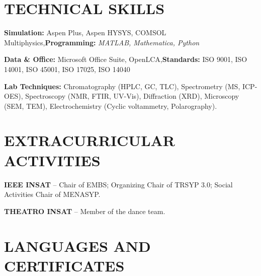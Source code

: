 \documentclass[10pt]{article}
\begin{document}
\section{TECHNICAL SKILLS}
\begin{bul}
\item \textbf{Simulation:} Aspen Plus, Aspen HYSYS, COMSOL Multiphysics\sep\textbf{Programming:} \textit{MATLAB, Mathematica, Python}
\item \textbf{Data \& Office:} Microsoft Office Suite, OpenLCA\sep\textbf{Standards:} ISO 9001, ISO 14001, ISO 45001, ISO 17025, ISO 14040
\item \textbf{Lab Techniques:} Chromatography (HPLC, GC, TLC), Spectrometry (MS, ICP-OES), Spectroscopy (NMR, FTIR, UV-Vis), Diffraction (XRD), Microscopy (SEM, TEM), Electrochemistry (Cyclic voltammetry, Polarography).
\end{bul}

\section{EXTRACURRICULAR ACTIVITIES}
\begin{bul}
\item \textbf{IEEE INSAT} – Chair of EMBS; Organizing Chair of TRSYP 3.0; Social Activities Chair of MENASYP.
\item \textbf{THEATRO INSAT} – Member of the dance team.
\end{bul}

\section{LANGUAGES AND CERTIFICATES}
\end{document}
